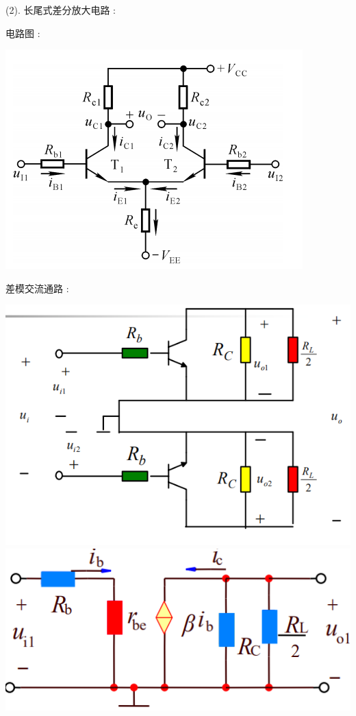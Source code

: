 \documentclass[UTF8, 12pt]{ctexart}
\begin{document}
	(2). 长尾式差分放大电路 :

	电路图 :

	\includegraphics[scale = 0.4]{03/长尾式差分放大电路电路图.png}

	差模交流通路 :

	\includegraphics[scale = 0.4]{03/长尾式差分放大电路差模输入交流通路.png} \includegraphics[scale = 0.4]{03/长尾式差分放大电路差模输入交流通路(2).png}
\end{document}
